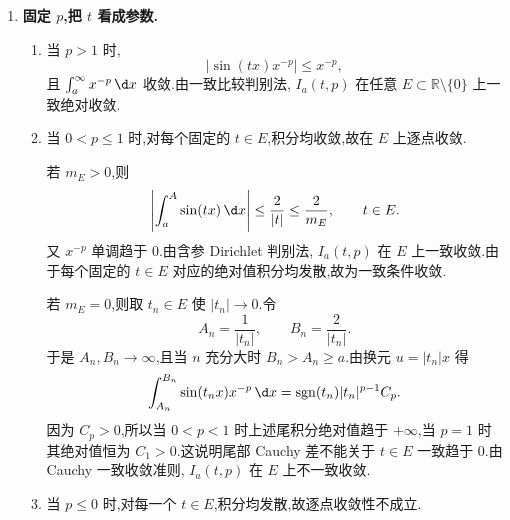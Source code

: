 \begin{example}
\begin{enumerate}
		综上,当 $t\neq0$ 时,
		\begin{gather*}
			\int_a^\infty \sin(tx)x^{-p}\,\d x
			\begin{cases}
				\text{绝对收敛},& p>1,\\[3pt]
				\text{条件收敛},& 0<p\leq1,\\[3pt]
				\text{发散},& p\leq0.
			\end{cases}
		\end{gather*}

		\item \textbf{固定 $p$,把 $t$ 看成参数.}

		\begin{enumerate}
			\item 当 $p>1$ 时,
			\begin{equation*}
				|\sin(tx)x^{-p}|\leq x^{-p},
			\end{equation*}
			且 $\int_a^\infty x^{-p}\,\d x$ 收敛.由一致比较判别法, $I_a(t,p)$ 在任意 $E\subset\mathbb R\setminus\{0\}$ 上一致绝对收敛.

			\item 当 $0<p\leq1$ 时,对每个固定的 $t\in E$,积分均收敛,故在 $E$ 上逐点收敛.

			若 $m_E>0$,则
			\begin{equation*}
				\left|\int_a^A\sin(tx)\,\d x\right|
				\leq \frac{2}{|t|}
				\leq \frac{2}{m_E},
				\qquad t\in E.
			\end{equation*}
			又 $x^{-p}$ 单调趋于 $0$.由含参 Dirichlet 判别法, $I_a(t,p)$ 在 $E$ 上一致收敛.由于每个固定的 $t\in E$ 对应的绝对值积分均发散,故为一致条件收敛.

			若 $m_E=0$,则取 $t_n\in E$ 使 $|t_n|\to0$.令
			\begin{equation*}
				A_n=\frac1{|t_n|},
				\qquad
				B_n=\frac2{|t_n|}.
			\end{equation*}
			于是 $A_n,B_n\to\infty$,且当 $n$ 充分大时 $B_n>A_n\geq a$.由换元 $u=|t_n|x$ 得
			\begin{equation*}
				\int_{A_n}^{B_n}\sin(t_nx)x^{-p}\,\d x
				=
				\operatorname{sgn}(t_n)|t_n|^{p-1}C_p.
			\end{equation*}
			因为 $C_p>0$,所以当 $0<p<1$ 时上述尾积分绝对值趋于 $+\infty$,当 $p=1$ 时其绝对值恒为 $C_1>0$.这说明尾部 Cauchy 差不能关于 $t\in E$ 一致趋于 $0$.由 Cauchy 一致收敛准则, $I_a(t,p)$ 在 $E$ 上不一致收敛.

			\item 当 $p\leq0$ 时,对每一个 $t\in E$,积分均发散,故逐点收敛性不成立.
		\end{enumerate}


\end{enumerate}
\end{example}
